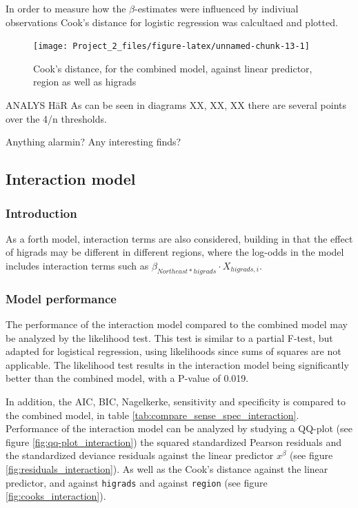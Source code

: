 \documentclass[a4paper]{article}
\begin{document}
In order to measure how the \(\beta\)-estimates were influenced by
indiviual observations Cook's distance for logistic regression was
calcultaed and plotted.

\begin{figure}[h]
\texttt{[image: Project\_2\_files/figure-latex/unnamed-chunk-13-1]} \caption{\label{fig:cooks_combined}Cook's distance, for the combined model, against linear predictor, region as well as higrads}\label{fig:unnamed-chunk-13}
\end{figure}

ANALYS HäR As can be seen in diagrams XX, XX, XX there are several
points over the 4/n thresholds.

Anything alarmin? Any interesting finds?

\hypertarget{interaction-model}{%
\subsection{Interaction model}\label{interaction-model}}

\hypertarget{introduction-4}{%
\subsubsection{Introduction}\label{introduction-4}}

As a forth model, interaction terms are also considered, building in
that the effect of higrads may be different in different regions, where
the log-odds in the model includes interaction terms such as
\(\beta_{Northeast * higrads} \cdot X_{higrads,i}\).

\hypertarget{model-performance}{%
\subsubsection{Model performance}\label{model-performance}}

The performance of the interaction model compared to the combined model
may be analyzed by the likelihood test. This test is similar to a
partial F-test, but adapted for logistical regression, using likelihoods
since sums of squares are not applicable. The likelihood test results in
the interaction model being significantly better than the combined
model, with a P-value of 0.019.

In addition, the AIC, BIC, Nagelkerke, sensitivity and specificity is
compared to the combined model, in table
\ref{tab:compare_sense_spec_interaction}. Performance of the interaction
model can be analyzed by studying a QQ-plot (see figure
\ref{fig:qq-plot_interaction}) the squared standardized Pearson
residuals and the standardized deviance residuals against the linear
predictor \(x^{\beta}\) (see figure \ref{fig:residuals_interaction}). As
well as the Cook's distance against the linear predictor, and against
\texttt{higrads} and against \texttt{region} (see figure
\ref{fig:cooks_interaction}).
\end{document}
